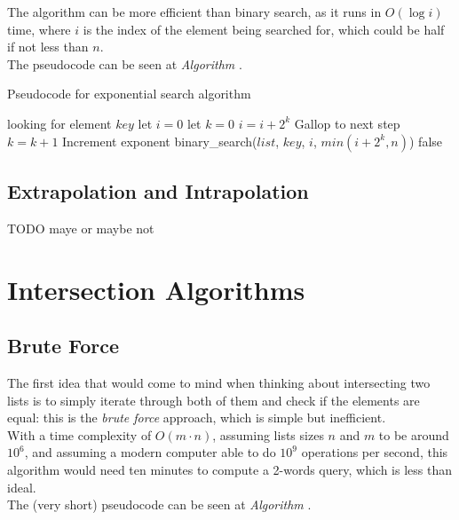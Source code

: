 The algorithm can be more efficient than binary search, as it runs in $O(\log i)$ time, where $i$ is the index of the element being searched for, which could be half if not less than $n$.\\
The pseudocode can be seen at \textit{Algorithm} .\\

\begin{algorithm}
    \captionsetup{labelsep=newline}
    \caption{Pseudocode for exponential search algorithm \label{alg:expsearch}}
    \begin{algorithmic}[1]
        \State looking for element $key$
        \State let $i=0$ 
        \State let $k=0$
            \State $i=i+2^k$ \Comment Gallop to next step
            \State $k=k+1$ \Comment Increment exponent
        \EndWhile
            \State binary\_search($list$, $key$, $i$, $min(i+2^k,n)$) 
        \Else
            \State \Return false 
        \EndIf
    \end{algorithmic}
\end{algorithm}

\subsection{Extrapolation and Intrapolation \label{sec:extrapol}}

TODO maye or maybe not 

\section{Intersection Algorithms}

\subsection{Brute Force \label{sec:bruteforce}}

The first idea that would come to mind when thinking about intersecting two lists is to simply iterate through both of them and check if the elements are equal: this is the \textit{brute force} approach, which is simple but inefficient. \\
With a time complexity of $O(m \cdot n)$, assuming lists sizes $n$ and $m$ to be around $10^6$, and assuming a modern computer able to do $10^9$ operations per second, this algorithm would need ten minutes to compute a 2-words query, which is less than ideal.\\
The (very short) pseudocode can be seen at \textit{Algorithm} .\\

